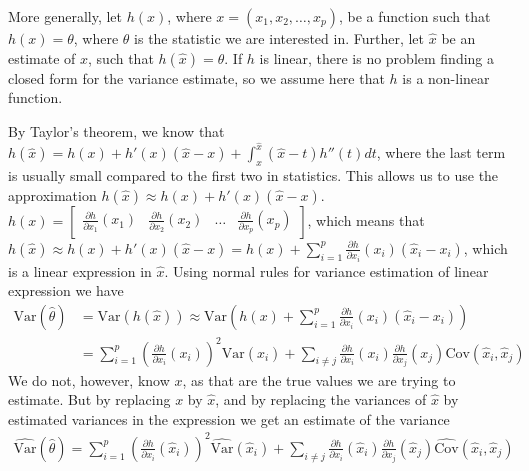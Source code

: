 \documentclass{article}
\begin{document}
More generally, let \(h(x)\), where \(x = (x_1, x_2, \dots, x_p)\), be a function such that \(h(x) = \theta\), where
\(\theta\) is the statistic we are interested in. Further, let \(\hat{x}\) be an
estimate of \(x\), such that \(h(\hat{x}) = \hat{\theta}\). If \(h\) is
linear, there is no problem finding a closed form for the variance estimate,
so we assume here that \(h\) is a non-linear function.

By Taylor's theorem, we know that \(h(\hat{x}) = h(x) + h'(x) (\hat{x} - x) + \int_x^{\hat{x}}  (\hat{x} -
t) h''(t) dt\), where the last term is usually small compared to the first two
in statistics. This allows us to use the approximation \(h(\hat{x}) \approx h(x) +
h'(x) (\hat{x} - x)\). \(h(x) = \begin{bmatrix} \frac{\partial h}{\partial x_1}
  (x_1) & \frac{\partial h}{\partial x_2} (x_2) & \dots & \frac{\partial
    h}{\partial x_p} (x_p)\end{bmatrix}\), which means that \(h(\hat{x}) \approx
h(x) + h'(x) (\hat{x} -
x) = h(x) + \sum_{i = 1}^p \frac{\partial h}{\partial x_i} (x_i) \left( \hat{x}_i - x_i
\right)\), which is a linear expression in \(\hat{x}\). Using normal rules for
variance estimation of linear expression we have
\begin{align*}
  \mathrm{Var} \left( \hat{\theta} \right)
  &= \mathrm{Var} \left( h(\hat{x}) \right)
  \approx \mathrm{Var} \left( h(x) + \sum_{i = 1}^p \frac{\partial h}{\partial x_i} (x_i) \left( \hat{x}_i - x_i
    \right) \right) \\
    &= \sum_{i = 1}^p \left( \frac{\partial h}{\partial x_i} (x_i)  \right)^2 \mathrm{Var} \left( \hat{x}_i \right) + \sum_{i \neq j}  \frac{\partial h}{\partial x_i} (x_i)  \frac{\partial h}{\partial x_j} (x_j)  \mathrm{Cov} \left( \hat{x}_i, \hat{x}_j \right)
\end{align*}
We do not, however, know \(x\), as that are the true values we are trying to
estimate. But by replacing \(x\) by \(\hat{x}\), and by replacing the variances
of \(\hat{x}\) by estimated variances in the expression we get an
estimate of the variance
\begin{align*}
  \widehat{\mathrm{Var}} \left( \hat{\theta} \right)
  = \sum_{i = 1}^p \left( \frac{\partial h}{\partial x_i} (\hat{x}_i)  \right)^2 \widehat{\mathrm{Var}} \left( \hat{x}_i \right) + \sum_{i \neq j}  \frac{\partial h}{\partial x_i} (\hat{x}_i)  \frac{\partial h}{\partial x_j} (\hat{x}_j)  \widehat{\mathrm{Cov}} \left( \hat{x}_i, \hat{x}_j \right)
\end{align*}
\end{document}
